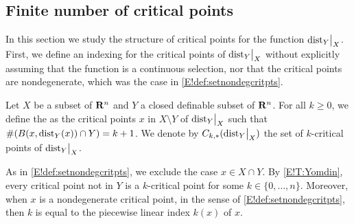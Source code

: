 \subsection{Finite number of critical points}

In this section we study the structure of critical points for the function $\mathord{\operatorname{dist}}_Y\big|_X$. First, we define an indexing for the critical points of $\mathord{\operatorname{dist}}_Y\big|_X$ without explicitly assuming that the function is a continuous selection, nor that the critical points are nondegenerate, which was the case in \cref{E!def:setnondegcritpts}.

\begin{definition}
\label{E!D:k-crit-pt}
  Let $X$ be a subset of $\mathbf{R}^n$ and $Y$ a closed definable subset of $\mathbf{R}^n$. For all $k \geq 0$, we define the  as the critical points $x$ in $X \setminus Y$ of $\mathord{\operatorname{dist}}_Y\big|_X$ such that $\#(B(x, \operatorname{dist}_Y(x)) \cap Y) = k + 1$.
  We denote by $C_{k, *}(\mathord{\operatorname{dist}}_Y\big|_X)$ the set of $k$-critical points of $\mathord{\operatorname{dist}}_Y\big|_X$. 
\end{definition}

As in \cref{E!def:setnondegcritpts}, we exclude the case $x \in X \cap Y$. By \cref{E!T:Yomdin}, every critical point not in $Y$ is a $k$-critical point for some $k \in \{0, \ldots, n\}$. Moreover, when $x$ is a nondegenerate critical point, in the sense of \cref{E!def:setnondegcritpts}, then $k$ is equal to the piecewise linear index $k(x)$ of $x$. 

